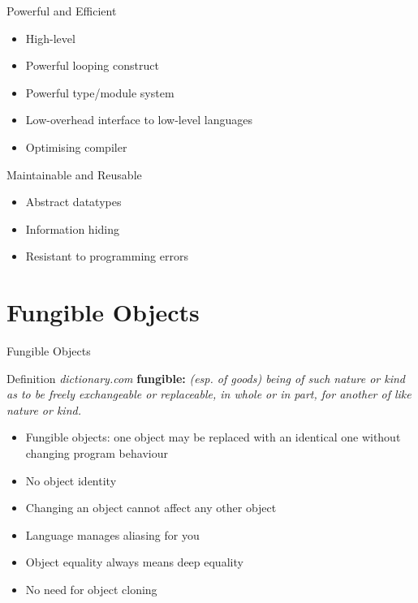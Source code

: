 \documentclass[12pt]{beamer}
\begin{document}
\begin{frame}{\LARGE Powerful and Efficient}
  \begin{itemize}
  \item High-level
  \item Powerful looping construct
  \item Powerful type/module system
  \item Low-overhead interface to low-level languages
  \item Optimising compiler
  \end{itemize}
\end{frame}


\begin{frame}{\LARGE Maintainable and Reusable}
  \begin{itemize}
  \item Abstract datatypes
  \item Information hiding
  \item Resistant to programming errors
  \end{itemize}
\end{frame}


\section{Fungible Objects}
\begin{frame}{\LARGE Fungible Objects}
  \begin{block}{Definition \hfill \emph{\small dictionary.com}}
    \textbf{fungible:}
    \emph{(esp. of goods) being of such nature or kind as
      to be freely exchangeable or replaceable, in whole or in part, for
      another of like nature or kind.} 
  \end{block}
  \begin{itemize}[<+->]
  \item Fungible objects:  one object may be replaced with an identical one
    without changing program behaviour
  \item No object identity
  \item Changing an object cannot affect any other object
  \item Language manages aliasing for you
  \item Object equality always means deep equality
  \item No need for object cloning
  \end{itemize}
\end{frame}
\end{document}
